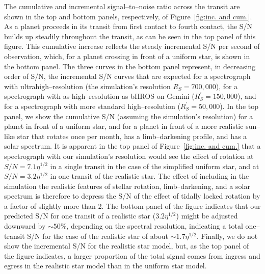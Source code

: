 \documentclass[12pt,preprint]{aastex}
\begin{document}
The cumulative and incremental signal--to--noise ratio across the transit
are shown in the top and bottom panels, respectively, of
Figure~\ref{fig:inc. and cum.}.  As a planet proceeds in its transit from
first contact to fourth contact, the S/N builds up steadily throughout
the transit, as can be seen in the top panel of
this figure.  This cumulative increase reflects the steady
incremental S/N per second of observation, which, for a planet
crossing in front of a uniform star, is shown in the bottom panel.
The three curves in the bottom panel represent, in decreasing
order of S/N, the incremental S/N curves that are expected for a spectrograph
with ultrahigh--resolution (the simulation's resolution $R_S = 700,000$),
for a spectrograph with as high--resolution as bHROS on Gemini
($R^\prime_S = 150,000$), and for a spectrograph with more standard
high--resolution
($R^\prime_S = 50,000$).  In the top panel, we show the cumulative S/N (assuming
the simulation's resolution) for a planet in front of a uniform star, and for
a planet in front of a more realistic sun--like star that rotates once per
month, has a limb--darkening profile, and has a solar spectrum.  It
is apparent in the top panel of Figure~\ref{fig:inc. and cum.} that a
spectrograph with our simulation's resolution would see the effect of rotation
at $S/N = 7.1 \eta^{1/2}$ in a single transit in the case of the simplified
uniform star, and at $S/N = 3.2 \eta^{1/2}$ in one transit of the realistic star.
The effect of including in the simulation the realistic features of stellar rotation,
limb--darkening, and a solar spectrum is therefore to depress the S/N of the
effect of tidally locked rotation by a factor of slightly more than 2.  The bottom
panel of the figure indicates that our predicted S/N for one transit of a realistic
star ($3.2 \eta^{1/2}$) might be adjusted downward by $\sim 50\%$, depending on the
spectral resolution, indicating a total one--transit S/N for the case of the
realistic star of about $\sim 1.7 \eta^{1/2}$.  Finally, we do not show the
incremental S/N for the realistic star model, but, as the top panel of the figure
indicates, a larger proportion of the total signal comes from ingress and egress
in the realistic star model than in the uniform star model.
\end{document}
